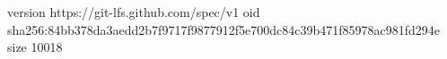 version https://git-lfs.github.com/spec/v1
oid sha256:84bb378da3aedd2b7f9717f9877912f5e700dc84c39b471f85978ac981fd294e
size 10018
